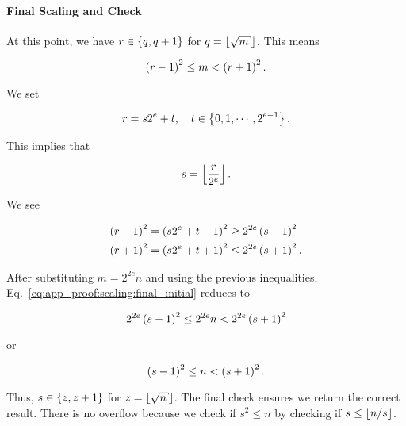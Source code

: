 \paragraph{Final Scaling and Check}
At this point, we have $r\in\left\{ q,q+1 \right\}$ for $q=\floor{\sqrt{m}}$.
This means

\begin{equation}
    \left( r-1 \right)^{2} \le m < \left( r+1 \right)^{2}.
    \label{eq:app_proof:scaling:final_initial}
\end{equation}

We set

\begin{equation}
    r = s2^{e} + t, \quad t\in\left\{ 0,1,\cdots,2^{e-1} \right\}.
\end{equation}

\noindent
This implies that

\begin{equation}
    s = \left\lfloor \frac{r}{2^{e}} \right\rfloor.
\end{equation}

\noindent
We see

\begin{align}
    \left( r-1 \right)^{2} &= \left( s2^{e} + t - 1 \right)^{2} \ge 2^{2e}\left( s-1 \right)^{2}
        \nonumber\\
    \left( r+1 \right)^{2} &= \left( s2^{e} + t + 1 \right)^{2} \le 2^{2e}\left( s+1 \right)^{2}.
\end{align}

\noindent
After substituting $m=2^{2e}n$ and using the previous inequalities,
Eq.~\eqref{eq:app_proof:scaling:final_initial} reduces to

\begin{equation}
    2^{2e}\left( s-1 \right)^{2} \le 2^{2e}n < 2^{2e}\left( s+1 \right)^{2}
\end{equation}

\noindent
or

\begin{equation}
    \left( s-1 \right)^{2} \le n < \left( s+1 \right)^{2}.
\end{equation}

\noindent
Thus, $s\in\left\{ z, z+1 \right\}$ for $z=\floor{\sqrt{n}}$.
The final check ensures we return the correct result.
There is no overflow because we check if $s^{2} \le n$
by checking if $s \le \left\lfloor n/s \right\rfloor$.

\subsubsection{\HyperFour{}}
\label{app:conv_proof:hyper4}

